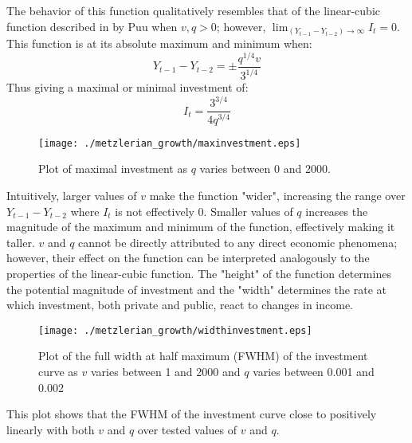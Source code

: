 The behavior of this function qualitatively resembles that of the linear-cubic function described in by Puu when $v,q>0$; however, $\lim_{(Y_{t-1}-Y_{t-2})\to\infty}I_t=0$. This function is at its absolute maximum and minimum when:
\begin{equation*}
    Y_{t-1}-Y_{t-2}=\pm\frac{q^{1/4}v}{3^{1/4}}
\end{equation*}
Thus giving a maximal or minimal investment of:
\begin{equation*}
    I_t=\frac{3^{3/4}}{4q^{3/4}}
\end{equation*}
\begin{figure}
    \centering
    \texttt{[image: ./metzlerian\_growth/maxinvestment.eps]}
    \caption{Plot of maximal investment as $q$ varies between 0 and 2000.}
    \label{metzlerian_growth-maxinvestment}
\end{figure}
Intuitively, larger values of $v$ make the function "wider", increasing the range over $Y_{t-1}-Y_{t-2}$ where $I_t$ is not effectively 0. Smaller values of $q$ increases the magnitude of the maximum and minimum of the function, effectively making it taller. $v$ and $q$ cannot be directly attributed to any direct economic phenomena; however, their effect on the function can be interpreted analogously to the properties of the linear-cubic function. The "height" of the function determines the potential magnitude of investment and the "width" determines the rate at which investment, both private and public, react to changes in income.
\begin{figure}
    \centering
    \texttt{[image: ./metzlerian\_growth/widthinvestment.eps]}
    \caption{Plot of the full width at half maximum (FWHM) of the investment curve as $v$ varies between 1 and 2000 and $q$ varies between 0.001 and 0.002}
    \label{metzlerian_growth-widthinvestment}
\end{figure}
This plot shows that the FWHM of the investment curve close to positively linearly with both $v$ and $q$ over tested values of $v$ and $q$.

